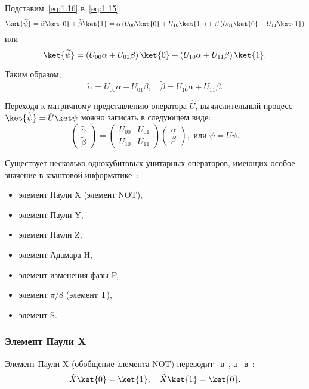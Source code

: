 \documentclass[pscyr,notitlepage]{hedwork}
\newcommand{\eq}[1]{\eqref{eq:#1}}
\renewcommand{\~}[1]{\widetilde{#1}}
\newcommand{\lb}{\left(}
\newcommand{\rb}{\right)}
\begin{document}
  Подставим~\eq{1.16} в~\eq{1.15}:
  \[
    \ket{\~\psi} = \~\alpha\ket{0} + \~\beta\ket{1} =
      \alpha\lb U_{00}\ket{0} + U_{10}\ket{1}\rb +
      \beta\lb U_{01}\ket{0} + U_{11}\ket{1}\rb
  \]
  или
  \[
    \ket{\~\psi} = \lb U_{00}\alpha + U_{01}\beta\rb\ket{0} +
      \lb U_{10}\alpha + U_{11}\beta\rb\ket{1}.
  \]
  
  Таким образом,
  \[
    \~\alpha = U_{00}\alpha + U_{01}\beta, \quad
      \~\beta = U_{10}\alpha + U_{11}\beta.
  \]
  
  Переходя к матричному представлению оператора \( \hat{U} \), вычислительный
  процесс \( \ket{\~\psi} = \hat{U}\ket\psi \) можно записать в следующем виде:
  \[
    \begin{pmatrix}
      \~\alpha \\ \~\beta
    \end{pmatrix} =
    \begin{pmatrix}
      U_{00} & U_{01} \\ U_{10} & U_{11}
    \end{pmatrix}
    \begin{pmatrix}
      \alpha \\ \beta
    \end{pmatrix}, \text{ или }
    \~\psi = U\psi.
  \]
  
  Существует несколько однокубитовых унитарных операторов, имеющих особое
  значение в квантовой информатике~\cite{main,task}:
  \begin{itemize}
    \itemsep -1.7ex
    \vspace{-1.5em}
    \item элемент Паули X (элемент NOT),
    \item элемент Паули Y,
    \item элемент Паули Z,
    \item элемент Адамара H,
    \item элемент изменения фазы P,
    \item элемент \( \pi / 8 \) (элемент T),
    \item элемент S.
  \end{itemize}
  
  \subsubsection{Элемент Паули X}
  
  Элемент Паули X (обобщение элемента NOT) переводит~ в~,
  а~ в~:
  \begin{equation}
    \hat{X}\ket{0} = \ket{1}, \quad \hat{X}\ket{1} = \ket{0}.
    \label{eq:2.1}
  \end{equation}
  
\end{document}
